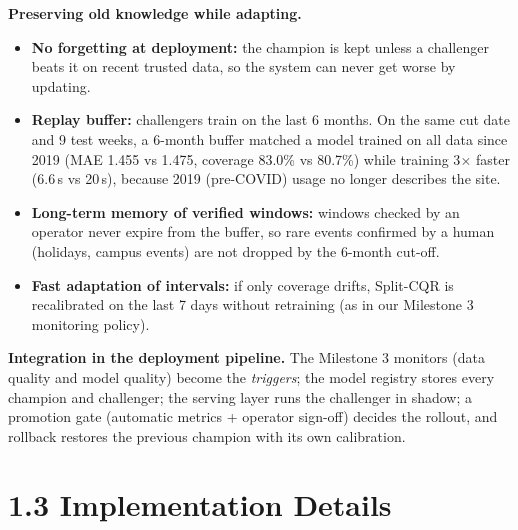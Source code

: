 \documentclass[11pt,letterpaper]{article}
\begin{document}
\textbf{Preserving old knowledge while adapting.}
\begin{itemize}
  \item \textbf{No forgetting at deployment:} the champion is kept unless a challenger beats it on recent trusted data,
  so the system can never get worse by updating.
  \item \textbf{Replay buffer:} challengers train on the last 6 months. On the same cut date and 9 test weeks, a
  6-month buffer matched a model trained on all data since 2019 (MAE 1.455 vs 1.475, coverage 83.0\% vs 80.7\%) while
  training 3$\times$ faster (6.6\,s vs 20\,s), because 2019 (pre-COVID) usage no longer describes the site.
  \item \textbf{Long-term memory of verified windows:} windows checked by an operator never expire from the buffer,
  so rare events confirmed by a human (holidays, campus events) are not dropped by the 6-month cut-off.
  \item \textbf{Fast adaptation of intervals:} if only coverage drifts, Split-CQR is recalibrated on the last 7 days
  without retraining (as in our Milestone 3 monitoring policy).
\end{itemize}

\textbf{Integration in the deployment pipeline.} The Milestone 3 monitors (data quality and model quality) become the
\emph{triggers}; the model registry stores every champion and challenger; the serving layer runs the challenger in
shadow; a promotion gate (automatic metrics + operator sign-off) decides the rollout, and rollback restores the
previous champion with its own calibration.

\section*{1.3 Implementation Details}
\end{document}
